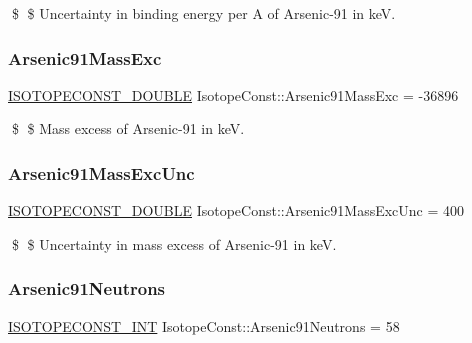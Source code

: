 \$ \$ Uncertainty in binding energy per A of Arsenic-\/91 in keV. \mbox{\label{group___isotope_const-_arsenic-_as91_ga85941d390fe6973f66e6b8c5a23c7a34}} 
\subsubsection{\texorpdfstring{Arsenic91\+Mass\+Exc}{Arsenic91MassExc}}
{\footnotesize\ttfamily \mbox{\hyperlink{group___isotope_const-_macros_ga8f45a7272ce02c0b4c65c44636ed719a}{I\+S\+O\+T\+O\+P\+E\+C\+O\+N\+S\+T\+\_\+\+D\+O\+U\+B\+LE}} Isotope\+Const\+::\+Arsenic91\+Mass\+Exc = -\/36896}

\$ \$ Mass excess of Arsenic-\/91 in keV. \mbox{\label{group___isotope_const-_arsenic-_as91_ga8a248d9f992147b04b651b6dcde04ce5}} 
\subsubsection{\texorpdfstring{Arsenic91\+Mass\+Exc\+Unc}{Arsenic91MassExcUnc}}
{\footnotesize\ttfamily \mbox{\hyperlink{group___isotope_const-_macros_ga8f45a7272ce02c0b4c65c44636ed719a}{I\+S\+O\+T\+O\+P\+E\+C\+O\+N\+S\+T\+\_\+\+D\+O\+U\+B\+LE}} Isotope\+Const\+::\+Arsenic91\+Mass\+Exc\+Unc = 400}

\$ \$ Uncertainty in mass excess of Arsenic-\/91 in keV. \mbox{\label{group___isotope_const-_arsenic-_as91_ga96e4fe0b5e6b6c8cb6c494a3f68a6d53}} 
\subsubsection{\texorpdfstring{Arsenic91\+Neutrons}{Arsenic91Neutrons}}
{\footnotesize\ttfamily \mbox{\hyperlink{group___isotope_const-_macros_ga5f18360b3e99483a35c32d789e62621c}{I\+S\+O\+T\+O\+P\+E\+C\+O\+N\+S\+T\+\_\+\+I\+NT}} Isotope\+Const\+::\+Arsenic91\+Neutrons = 58}

